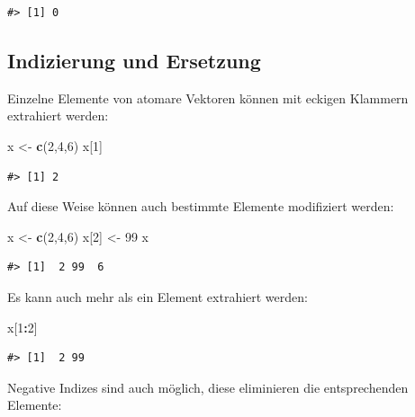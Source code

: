 \documentclass[]{book}
\newenvironment{Shaded}{\begin{snugshade}}{\end{snugshade}}
\newcommand{\KeywordTok}[1]{\textcolor[rgb]{0.13,0.29,0.53}{\textbf{#1}}}
\newcommand{\DecValTok}[1]{\textcolor[rgb]{0.00,0.00,0.81}{#1}}
\newcommand{\StringTok}[1]{\textcolor[rgb]{0.31,0.60,0.02}{#1}}
\newcommand{\OperatorTok}[1]{\textcolor[rgb]{0.81,0.36,0.00}{\textbf{#1}}}
\newcommand{\NormalTok}[1]{#1}
\begin{document}
\begin{verbatim}
#> [1] 0
\end{verbatim}

\subsection{Indizierung und Ersetzung}\label{indizierung-und-ersetzung}

Einzelne Elemente von atomare Vektoren können mit eckigen Klammern
extrahiert werden:

\begin{Shaded}
\begin{Highlighting}[]
\NormalTok{x <-}\StringTok{ }\KeywordTok{c}\NormalTok{(}\DecValTok{2}\NormalTok{,}\DecValTok{4}\NormalTok{,}\DecValTok{6}\NormalTok{)}
\NormalTok{x[}\DecValTok{1}\NormalTok{]}
\end{Highlighting}
\end{Shaded}

\begin{verbatim}
#> [1] 2
\end{verbatim}

Auf diese Weise können auch bestimmte Elemente modifiziert werden:

\begin{Shaded}
\begin{Highlighting}[]
\NormalTok{x <-}\StringTok{ }\KeywordTok{c}\NormalTok{(}\DecValTok{2}\NormalTok{,}\DecValTok{4}\NormalTok{,}\DecValTok{6}\NormalTok{)}
\NormalTok{x[}\DecValTok{2}\NormalTok{] <-}\StringTok{ }\DecValTok{99}
\NormalTok{x}
\end{Highlighting}
\end{Shaded}

\begin{verbatim}
#> [1]  2 99  6
\end{verbatim}

Es kann auch mehr als ein Element extrahiert werden:

\begin{Shaded}
\begin{Highlighting}[]
\NormalTok{x[}\DecValTok{1}\OperatorTok{:}\DecValTok{2}\NormalTok{]}
\end{Highlighting}
\end{Shaded}

\begin{verbatim}
#> [1]  2 99
\end{verbatim}

Negative Indizes sind auch möglich, diese eliminieren die entsprechenden
Elemente:
\end{document}
